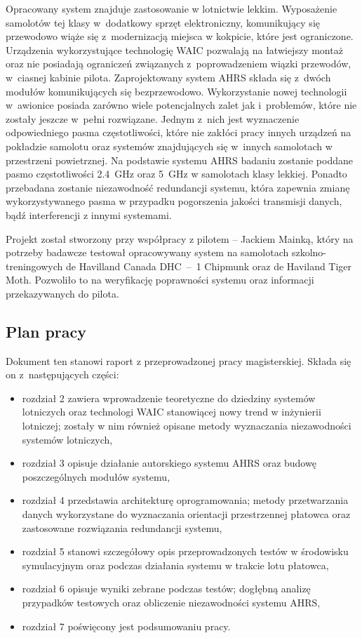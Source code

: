 \documentclass[a4paper, 12pt, twoside]{article}
\begin{document}
Opracowany system znajduje zastosowanie w lotnictwie lekkim. Wyposażenie samolotów tej klasy w~dodatkowy sprzęt elektroniczny, komunikujący się przewodowo wiąże się z~modernizacją miejsca w kokpicie, które jest ograniczone. Urządzenia wykorzystujące technologię WAIC pozwalają na łatwiejszy montaż oraz nie posiadają ograniczeń związanych z~poprowadzeniem wiązki przewodów, w~ciasnej kabinie pilota. Zaprojektowany system AHRS składa się z~dwóch modułów komunikujących się bezprzewodowo. Wykorzystanie nowej technologii w~awionice posiada zarówno wiele potencjalnych zalet jak i~problemów, które nie zostały jeszcze w~pełni rozwiązane. Jednym z~nich jest wyznaczenie odpowiedniego pasma częstotliwości, które nie zakłóci pracy innych urządzeń na pokładzie samolotu oraz systemów znajdujących się w~innych samolotach w przestrzeni powietrznej. Na podstawie systemu AHRS badaniu zostanie poddane pasmo częstotliwości 2.4~GHz oraz 5~GHz w samolotach klasy lekkiej. Ponadto przebadana zostanie niezawodność redundancji systemu, która zapewnia zmianę wykorzystywanego pasma w przypadku pogorszenia jakości transmisji danych, bądź interferencji z innymi systemami.

Projekt został stworzony przy współpracy z pilotem -- Jackiem Mainką, który na potrzeby badawcze testował opracowywany system  na samolotach szkolno-treningowych de Havilland Canada DHC~--~1 Chipmunk oraz de Haviland Tiger Moth. Pozwoliło to na weryfikację poprawności systemu oraz informacji przekazywanych do pilota.

\subsection{Plan pracy}

Dokument ten stanowi raport z przeprowadzonej pracy magisterskiej. Składa się on z~następujących części:
\begin{itemize}
\item rozdział 2 zawiera wprowadzenie teoretyczne do dziedziny systemów lotniczych oraz technologi WAIC stanowiącej nowy trend w inżynierii lotniczej; zostały w nim również opisane metody wyznaczania niezawodności systemów lotniczych,
\item rozdział 3 opisuje działanie autorskiego systemu AHRS oraz budowę poszczególnych modułów systemu,
\item rozdział 4 przedstawia architekturę oprogramowania; metody przetwarzania danych wykorzystane do wyznaczania orientacji przestrzennej płatowca oraz zastosowane rozwiązania redundancji systemu,
\item rozdział 5 stanowi szczegółowy opis przeprowadzonych testów w środowisku symulacyjnym oraz podczas działania systemu w trakcie lotu płatowca,
\item rozdział 6 opisuje wyniki zebrane podczas testów; dogłębną analizę przypadków testowych oraz obliczenie niezawodności systemu AHRS,
\item rozdział 7 poświęcony jest podsumowaniu pracy.  
\end{itemize} 
\end{document}
